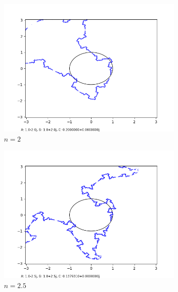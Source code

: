 \documentclass[12pt,a4paper,reqno,parskip=full]{amsart}
\numberwithin{equation}{section}
\theoremstyle{plain}
\theoremstyle{definition}
\begin{document}
\begin{figure}[H]
     \hfill 
     \begin{subfigure}[b]{0.3\textwidth}
         \centering
         \includegraphics[width=\textwidth]{images/nn/a-2 b2 h30 d0.01.png}
         \caption{$n=2$}
         \label{fig:n2}
     \end{subfigure}
     \begin{subfigure}[b]{0.3\textwidth}
         \centering
         \includegraphics[width=\textwidth]{images/nn/a-2.5 b2.5 h30 d0.01.png}
         \caption{$n=2.5$}
         \label{fig:n2.5}
     \end{subfigure}
     \hfill
     \begin{subfigure}[b]{0.3\textwidth}
         \centering

\end{subfigure}
\end{figure}
\end{document}
